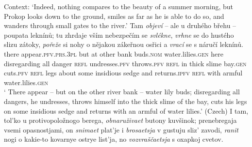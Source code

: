 \documentclass[output=paper,colorlinks,citecolor=brown]{langscibook}
\begin{document}
\eanoraggedright\label{ex:krak}
Context: `Indeed, nothing compares to the beauty of a summer morning, but Prokop looks down to the ground, smiles as far as he is able to do so, and wanders through small gates to the river.'
\ea
\gll %
Tam \textit{objeví} -- ale u druhého břehu -- poupata leknínů; tu zhrdaje vším nebezpečím se \textit{svlékne}, \textit{vrhne} se do hustého slizu zátoky, \textit{pořeže} si nohy o nějakou zákeřnou osřici a \textit{vrací} se s náručí leknínů.\\
there appear.\textsc{pfv.prs.3pl} {} but at other bank {} buds.\textsc{nom} water.lilies.\textsc{gen} here disregarding all danger \textsc{refl} undresses.\textsc{pfv} throws.\textsc{pfv} \textsc{refl} in thick slime bay.\textsc{gen} cuts.\textsc{pfv} \textsc{refl} legs about some insidious sedge and returns.\textsc{ipfv} \textsc{refl} with armful water.lilies.\textsc{gen} \\
\glt `%
There appear -- but on the other river bank -- water lily buds; disregarding all dangers, he undresses, throws himself into the thick slime of the bay, cuts his legs on some insidious sedge and returns with an armful of water lilies.' \hfill (Czech)
\ex 
\gll %
I tam, tol'ko u protivopoložnogo berega, \textit{obnaruživaet} butony kuvšinok; prenebregaja vsemi opasnostjami, on \textit{snimaet} plat'je i \textit{brosaetsja} v gustuju sliz' zavodi, \textit{ranit} nogi o kakie-to kovarnye ostrye list'ja, no \textit{vozvraščaetsja} s oxapkoj cvetov.\\
\end{document}
